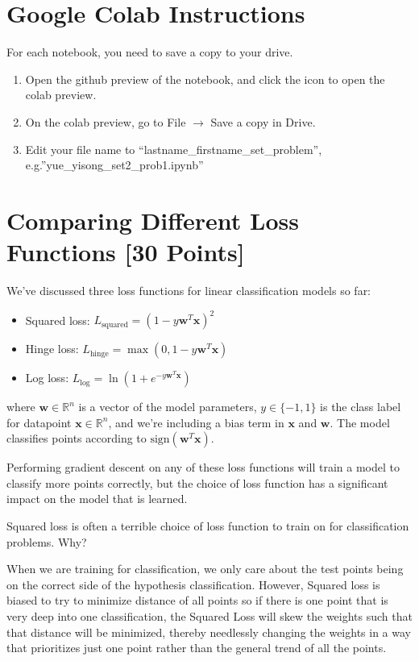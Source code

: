 \section*{Google Colab Instructions}
For each notebook, you need to save a copy to your drive.
\begin{enumerate}
	\item Open the github preview of the notebook, and click the icon to open the colab preview.
	\item On the colab preview, go to File $\rightarrow$ Save a copy in Drive.
	\item Edit your file name to “lastname_firstname_set_problem”, e.g.”yue_yisong_set2_prob1.ipynb”
\end{enumerate}



\newpage
\section{Comparing Different Loss Functions [30 Points]}

We've discussed three loss functions for linear classification models so far:
\begin{itemize}
\item Squared loss: $L_\text{squared} = (1 - y\mathbf{w}^T\mathbf{x})^2$
\item Hinge loss: $L_\text{hinge} = \max(0, 1 - y\mathbf{w}^T\mathbf{x})$
\item Log loss: $L_\text{log} = \ln(1 + e^{-y\mathbf{w}^T\mathbf{x}})$
\end{itemize}
where $\mathbf{w} \in \mathbb{R}^n$ is a vector of the model parameters, $y \in \{-1,1\}$ is the class label for datapoint $\mathbf{x} \in \mathbb{R}^n$, and we're including a bias term in $\mathbf{x}$ and $\mathbf{w}$.  The model classifies points according to $\text{sign}(\mathbf{w}^T\mathbf{x})$.

Performing gradient descent on any of these loss functions will train a model to classify more points correctly, but the choice of loss function has a significant impact on the model that is learned.

\problem[3]
Squared loss is often a terrible choice of loss function to train on for classification problems.  Why?

\begin{solution}
  When we are training for classification, we only care about the test points being on the correct side of the hypothesis classification. However, Squared loss is biased to try to minimize distance of all points so if there is one point that is very deep into one classification, the Squared Loss will skew the weights such that that distance will be minimized, thereby needlessly changing the weights in a way that prioritizes just one point rather than the general trend of all the points.
\end{solution}


